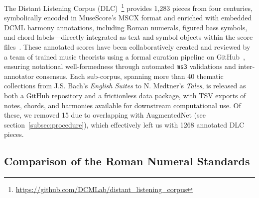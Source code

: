 \documentclass[sigconf]{acmart} %
\begin{document}
The Distant Listening Corpus (DLC)~\footnote{\url{https://github.com/DCMLab/distant_listening_corpus}} provides 1,283 pieces from four centuries, symbolically encoded in MuseScore’s MSCX format and enriched with embedded DCML harmony annotations, including Roman numerals, figured bass symbols, and chord labels---directly integrated as text and symbol objects within the score files~\cite{Hentschel2025_CorpusModularInfrastructure}. These annotated scores have been collaboratively created and reviewed by a team of trained music theorists using a formal curation pipeline on GitHub~\cite{Hentschel2021_SemiautomatedWorkflowParadigm}, ensuring notational well-formedness through automated \texttt{ms3} validations and inter-annotator consensus. Each sub-corpus, spanning more than 40 thematic collections from J.S. Bach’s \textit{English Suites} to N. Medtner’s \textit{Tales}, is released as both a GitHub repository and a frictionless data package, with TSV exports of notes, chords, and harmonies available for downstream computational use. Of these, we removed 15 due to overlapping with AugmentedNet (see section~\ref{subsec:procedure}), which effectively left us with 1268 annotated DLC pieces.




\subsection{Comparison of the Roman Numeral Standards}
\end{document}
